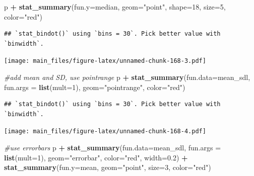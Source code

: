 \documentclass[]{book}
\newenvironment{Shaded}{\begin{snugshade}}{\end{snugshade}}
\newcommand{\KeywordTok}[1]{\textcolor[rgb]{0.13,0.29,0.53}{\textbf{#1}}}
\newcommand{\DataTypeTok}[1]{\textcolor[rgb]{0.13,0.29,0.53}{#1}}
\newcommand{\DecValTok}[1]{\textcolor[rgb]{0.00,0.00,0.81}{#1}}
\newcommand{\FloatTok}[1]{\textcolor[rgb]{0.00,0.00,0.81}{#1}}
\newcommand{\StringTok}[1]{\textcolor[rgb]{0.31,0.60,0.02}{#1}}
\newcommand{\CommentTok}[1]{\textcolor[rgb]{0.56,0.35,0.01}{\textit{#1}}}
\newcommand{\OperatorTok}[1]{\textcolor[rgb]{0.81,0.36,0.00}{\textbf{#1}}}
\newcommand{\NormalTok}[1]{#1}
\begin{document}
\begin{Shaded}
\begin{Highlighting}[]
\NormalTok{p }\OperatorTok{+}\StringTok{ }\KeywordTok{stat_summary}\NormalTok{(}\DataTypeTok{fun.y=}\NormalTok{median, }\DataTypeTok{geom=}\StringTok{"point"}\NormalTok{, }\DataTypeTok{shape=}\DecValTok{18}\NormalTok{,}
                 \DataTypeTok{size=}\DecValTok{5}\NormalTok{, }\DataTypeTok{color=}\StringTok{"red"}\NormalTok{)}
\end{Highlighting}
\end{Shaded}

\begin{verbatim}
## `stat_bindot()` using `bins = 30`. Pick better value with `binwidth`.
\end{verbatim}

\texttt{[image: main\_files/figure-latex/unnamed-chunk-168-3.pdf]}

\begin{Shaded}
\begin{Highlighting}[]
\CommentTok{#add mean and SD, use pointrange}
\NormalTok{p }\OperatorTok{+}\StringTok{ }\KeywordTok{stat_summary}\NormalTok{(}\DataTypeTok{fun.data=}\NormalTok{mean_sdl, }\DataTypeTok{fun.args =} \KeywordTok{list}\NormalTok{(}\DataTypeTok{mult=}\DecValTok{1}\NormalTok{), }
                 \DataTypeTok{geom=}\StringTok{"pointrange"}\NormalTok{, }\DataTypeTok{color=}\StringTok{"red"}\NormalTok{)}
\end{Highlighting}
\end{Shaded}

\begin{verbatim}
## `stat_bindot()` using `bins = 30`. Pick better value with `binwidth`.
\end{verbatim}

\texttt{[image: main\_files/figure-latex/unnamed-chunk-168-4.pdf]}

\begin{Shaded}
\begin{Highlighting}[]
\CommentTok{#use errorbars}
\NormalTok{p }\OperatorTok{+}\StringTok{ }\KeywordTok{stat_summary}\NormalTok{(}\DataTypeTok{fun.data=}\NormalTok{mean_sdl, }\DataTypeTok{fun.args =} \KeywordTok{list}\NormalTok{(}\DataTypeTok{mult=}\DecValTok{1}\NormalTok{), }
        \DataTypeTok{geom=}\StringTok{"errorbar"}\NormalTok{, }\DataTypeTok{color=}\StringTok{"red"}\NormalTok{, }\DataTypeTok{width=}\FloatTok{0.2}\NormalTok{) }\OperatorTok{+}
\StringTok{  }\KeywordTok{stat_summary}\NormalTok{(}\DataTypeTok{fun.y=}\NormalTok{mean, }\DataTypeTok{geom=}\StringTok{"point"}\NormalTok{, }\DataTypeTok{size=}\DecValTok{3}\NormalTok{, }\DataTypeTok{color=}\StringTok{"red"}\NormalTok{)}
\end{Highlighting}
\end{Shaded}
\end{document}
